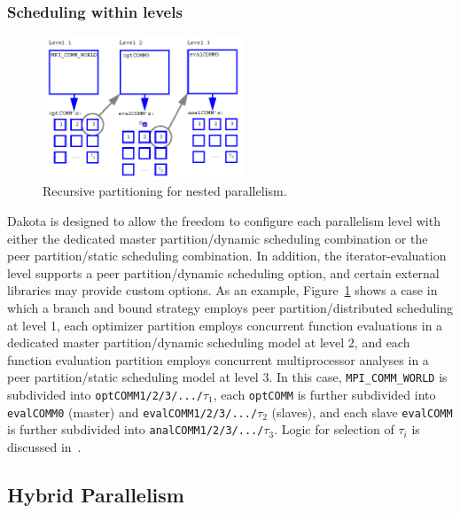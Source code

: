\subsubsection{Scheduling within levels}\label{parallel:MLP:message:scheduling}

\begin{figure}[ht]
  \centering
  \includegraphics[width=60mm]{images/recursive_partitioning}
  \caption{Recursive partitioning for nested parallelism.}
  \label{parallel:figure02}
\end{figure}

Dakota is designed to allow the freedom to configure each parallelism
level with either the dedicated master partition/dynamic scheduling
combination or the peer partition/static scheduling combination. In
addition, the iterator-evaluation level supports a peer partition/dynamic 
scheduling option, and certain external libraries may provide custom options.
As an
example, Figure~\ref{parallel:figure02} shows a case in which a branch
and bound strategy employs peer partition/distributed scheduling at
level 1, each optimizer partition employs concurrent function
evaluations in a dedicated master partition/dynamic scheduling model at
level 2, and each function evaluation partition employs concurrent
multiprocessor analyses in a peer partition/static scheduling model at
level 3. In this case, \texttt{MPI\_COMM\_WORLD} is subdivided into
\texttt{optCOMM1/2/3/.../$\tau_{1}$}, each \texttt{optCOMM} is further
subdivided into \texttt{evalCOMM0} (master) and
\texttt{evalCOMM1/2/3/.../$\tau_{2}$} (slaves), and each slave
\texttt{evalCOMM} is further subdivided into
\texttt{analCOMM1/2/3/.../$\tau_{3}$}.  Logic for selection of $\tau_i$
is discussed in~\cite{Eld00}.


\subsection{Hybrid Parallelism}\label{parallel:MLP:hybrid}

